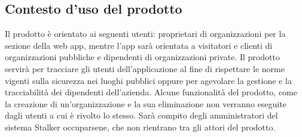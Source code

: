 \subsection{Contesto d'uso del prodotto}
Il prodotto è orientato ai seguenti utenti: proprietari di organizzazioni per la sezione della web app, mentre l'app sarà orientata a visitatori e clienti di organizzazioni pubbliche e dipendenti di organizzazioni private.
Il prodotto servirà per tracciare gli utenti dell'applicazione al fine di rispettare le norme vigenti sulla sicurezza nei luoghi pubblici oppure per agevolare la gestione e la tracciabilità dei dipendenti dell'azienda.
Alcune funzionalità del prodotto, come la creazione di un'organizzazione e la sua eliminazione non verranno eseguite dagli utenti a cui è rivolto lo stesso. Sarà compito degli amministratori del sistema Stalker occuparsene, che non rientrano tra gli attori del prodotto.

